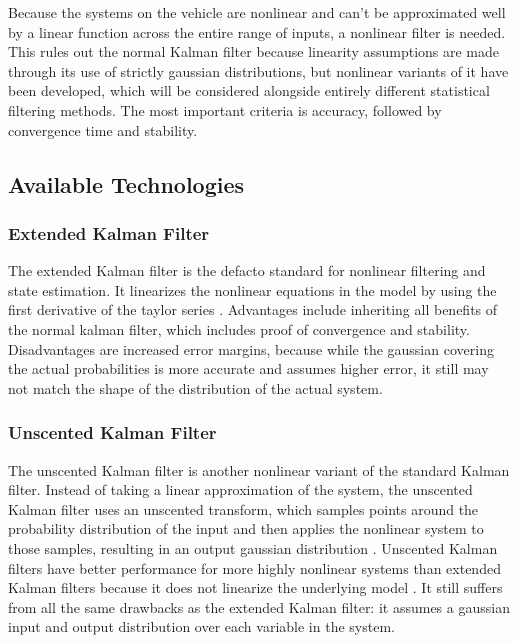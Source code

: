 \documentclass[10pt,draftclsnofoot,onecolumn]{article}
\begin{document}
Because the systems on the vehicle are nonlinear and can’t be approximated well by a linear function across the entire range of inputs, a nonlinear filter is needed. This rules out the normal Kalman filter because linearity assumptions are made through its use of strictly gaussian distributions, but nonlinear variants of it have been developed, which will be considered alongside entirely different statistical filtering methods. The most important criteria is accuracy, followed by convergence time and stability. 


\subsection{Available Technologies}
\subsubsection{Extended Kalman Filter}

The extended Kalman filter is the defacto standard for nonlinear filtering and state estimation. It linearizes the nonlinear equations in the model by using the first derivative of the taylor series \cite{harveen-ekf}. Advantages include inheriting all benefits of the normal kalman filter, which includes proof of convergence and stability. Disadvantages are increased error margins, because while the gaussian covering the actual probabilities is more accurate and assumes higher error, it still may not match the shape of the distribution of the actual system.

\subsubsection{Unscented Kalman Filter}

The unscented Kalman filter is another nonlinear variant of the standard Kalman filter. Instead of taking a linear approximation of the system, the unscented Kalman filter uses an unscented transform, which samples points around the probability distribution of the input and then applies the nonlinear system to those samples, resulting in an output gaussian distribution \cite{Julier2004}. Unscented Kalman filters have better performance for more highly nonlinear systems than extended Kalman filters because it does not linearize the underlying model \cite{Julier1997}. It still suffers from all the same drawbacks as the extended Kalman filter: it assumes a gaussian input and output distribution over each variable in the system.
\end{document}
